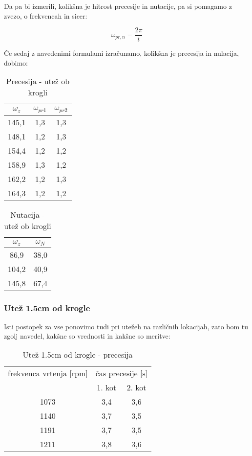 \documentclass[11pt, a4paper]{article}
\theoremstyle{definition}
\theoremstyle{example}
\theoremstyle{izrek}
\begin{document}
Da pa bi izmerili, kolikšna je hitrost precesije in nutacije, pa si pomagamo z zvezo, o frekvencah in sicer:

$$\omega_{pr,n}=\frac{2\pi}{t}$$

\pagebreak
Če sedaj z navedenimi formulami izračunamo, kolikšna je precesija in nulacija, dobimo: \\

\begin{table}[h]
	\centering
	\begin{tabular}{|c|c|c|}
		\hline
		\rule{0pt}{3ex}   
		$\omega_z$ & $\omega_{pr1}$\: & $\omega_{pr2}$\: \\
		\hline
		\hline
		145,1 &	1,3 &	1,3 \\
		\hline
		148,1 &	1,2 &	1,3 \\
		\hline
		154,4 &	1,2 &	1,2 \\
		\hline
		158,9 &	1,3 &	1,2 \\
		\hline
		162,2 &	1,2 &	1,3 \\
		\hline
		164,3 &	1,2 &	1,2 \\
		\hline
		
		
	\end{tabular}
\caption{Precesija - utež ob krogli}
\end{table}


\begin{table}[h]
	\centering
	\begin{tabular}{|c|c|}
		\hline
		\rule{0pt}{3ex}   
		$\omega_z$ & $\omega_{N}$ \\
		\hline
		\hline
		86,9 &	38,0 \\  
		\hline
		104,2 &	40,9 \\  
		\hline
		145,8 &	67,4  \\ 
		\hline
		
		
	\end{tabular}
\caption{Nutacija - utež ob krogli}
\end{table}
\pagebreak

\subsubsection{Utež 1.5cm od krogle}
Isti postopek za vse ponovimo tudi pri utežeh na različnih lokacijah, zato bom tu zgolj navedel, kakšne so vrednosti in kakšne so meritve: \\
\begin{table}[h]
	\centering
	\begin{tabular}{|c|c c|}
		\hline
		frekvenca vrtenja [rpm] & \multicolumn{2}{|c|}{čas precesije [s]} \\
		& 1. kot & 2. kot \\
		\hline
		\hline
		1073 &	3,4 &	3,6\\
		\hline
		1140 &	3,7 &	3,5\\
		\hline
		1191 &	3,7 &	3,5\\
		\hline
		1211 &	3,8 &	3,6\\
		\hline
	\end{tabular}
	\caption{Utež 1.5cm od krogle - precesija}
\end{table}
\end{document}

